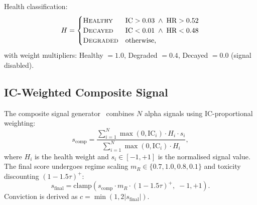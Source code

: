 \documentclass[11pt]{article}
\theoremstyle{definition}
\begin{document}
Health classification:
\[
H = \begin{cases}
  \text{\textsc{Healthy}}  & \text{IC} > 0.03 \;\wedge\; \text{HR} > 0.52 \\
  \text{\textsc{Decayed}}  & \text{IC} < 0.01 \;\wedge\; \text{HR} < 0.48 \\
  \text{\textsc{Degraded}} & \text{otherwise},
\end{cases}
\]
with weight multipliers: Healthy $= 1.0$, Degraded $= 0.4$,
Decayed $= 0.0$ (signal disabled).

\subsection{IC-Weighted Composite Signal}
\label{sec:composite}

The composite signal generator~\cite{chainofalpha2025} combines
$N$ alpha signals using IC-proportional weighting:
\begin{equation}
  s_{\text{comp}} = \frac{\sum_{i=1}^{N}
    \max(0, \text{IC}_i) \cdot H_i \cdot s_i}
  {\sum_{i=1}^{N} \max(0, \text{IC}_i) \cdot H_i},
  \label{eq:composite}
\end{equation}
where $H_i$ is the health weight and $s_i \in [-1, +1]$ is the
normalised signal value. The final score undergoes regime scaling
$m_R \in \{0.7, 1.0, 0.8, 0.1\}$ and toxicity discounting
$(1 - 1.5\tau)^+$:
\begin{equation}
  s_{\text{final}} = \text{clamp}\!\left(
    s_{\text{comp}} \cdot m_R \cdot (1 - 1.5\tau)^+,\;
    -1, +1\right).
  \label{eq:composite-final}
\end{equation}
Conviction is derived as $c = \min(1, 2|s_{\text{final}}|)$.
\end{document}
